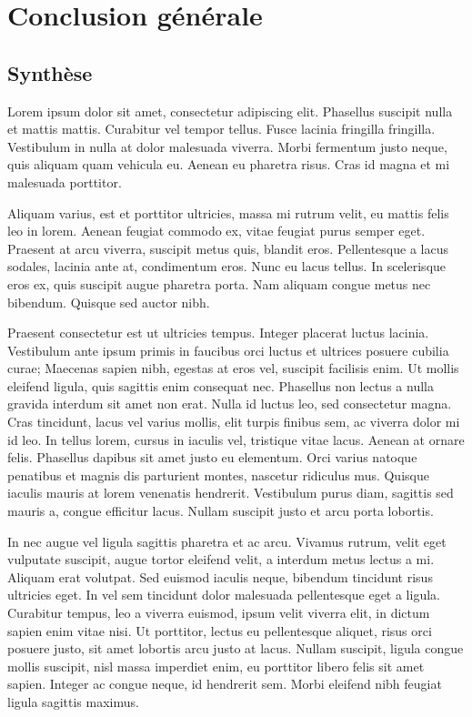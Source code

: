 %
\def\thischaptitle{Conclusion générale}
\chapter*{\thischaptitle}
\addcontentsline{toc}{chapter}{\thischaptitle}
%
\section{Synthèse}
Lorem ipsum dolor sit amet, consectetur adipiscing elit. Phasellus suscipit nulla et mattis mattis. Curabitur vel tempor tellus. 
Fusce lacinia fringilla fringilla. Vestibulum in nulla at dolor malesuada viverra. Morbi fermentum justo neque, quis aliquam quam vehicula eu. 
Aenean eu pharetra risus. Cras id magna et mi malesuada porttitor.

Aliquam varius, est et porttitor ultricies, massa mi rutrum velit, eu mattis felis leo in lorem. 
Aenean feugiat commodo ex, vitae feugiat purus semper eget. Praesent at arcu viverra, suscipit metus quis, blandit eros. 
Pellentesque a lacus sodales, lacinia ante at, condimentum eros. Nunc eu lacus tellus. In scelerisque eros ex, quis suscipit augue pharetra porta. 
Nam aliquam congue metus nec bibendum. Quisque sed auctor nibh.

Praesent consectetur est ut ultricies tempus. Integer placerat luctus lacinia. 
Vestibulum ante ipsum primis in faucibus orci luctus et ultrices posuere cubilia curae; Maecenas sapien nibh, egestas at eros vel, suscipit facilisis enim. 
Ut mollis eleifend ligula, quis sagittis enim consequat nec. Phasellus non lectus a nulla gravida interdum sit amet non erat. 
Nulla id luctus leo, sed consectetur magna. Cras tincidunt, lacus vel varius mollis, elit turpis finibus sem, ac viverra dolor mi id leo. 
In tellus lorem, cursus in iaculis vel, tristique vitae lacus. Aenean at ornare felis. Phasellus dapibus sit amet justo eu elementum. 
Orci varius natoque penatibus et magnis dis parturient montes, nascetur ridiculus mus. Quisque iaculis mauris at lorem venenatis hendrerit. 
Vestibulum purus diam, sagittis sed mauris a, congue efficitur lacus. Nullam suscipit justo et arcu porta lobortis.

In nec augue vel ligula sagittis pharetra et ac arcu. Vivamus rutrum, velit eget vulputate suscipit, augue tortor eleifend velit, a interdum metus lectus a mi. 
Aliquam erat volutpat. Sed euismod iaculis neque, bibendum tincidunt risus ultricies eget. 
In vel sem tincidunt dolor malesuada pellentesque eget a ligula. Curabitur tempus, leo a viverra euismod, ipsum velit viverra elit, in dictum sapien enim vitae nisi. Ut porttitor, lectus eu pellentesque aliquet, risus orci posuere justo, sit amet lobortis arcu justo at lacus. 
Nullam suscipit, ligula congue mollis suscipit, nisl massa imperdiet enim, eu porttitor libero felis sit amet sapien. 
Integer ac congue neque, id hendrerit sem. Morbi eleifend nibh feugiat ligula sagittis maximus.

